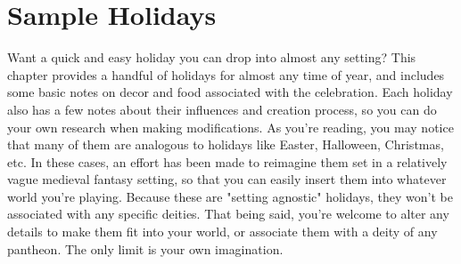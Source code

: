 \documentclass[10pt,a4paper,twoside,twocolumn,openany,bg=print,nodeprecatedcode]{dndbook}
\begin{document}
\chapter{Sample Holidays}
Want a quick and easy holiday you can drop into almost any setting? This chapter provides a handful of holidays for almost any time of year, and includes some basic notes on decor and food associated with the celebration. Each holiday also has a few notes about their influences and creation process, so you can do your own research when making modifications.
As you're reading, you may notice that many of them are analogous to holidays like Easter, Halloween, Christmas, etc. In these cases, an effort has been made to reimagine them set in a relatively vague medieval fantasy setting, so that you can easily insert them into whatever world you're playing. Because these are "setting agnostic" holidays, they won't be associated with any specific deities. That being said, you're welcome to alter any details to make them fit into your world, or associate them with a deity of any pantheon. The only limit is your own imagination.
\end{document}
